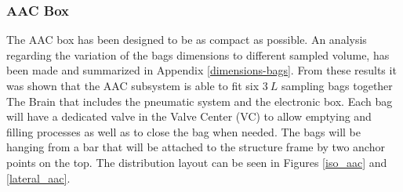 \documentclass[a4paper,12pt,twoside]{article}
\begin{document}
\subsubsection{AAC Box}\label{sec:aac-analysis}
The AAC box has been designed to be as compact as possible. An analysis regarding the variation of the bags dimensions to different sampled volume, has been made and summarized in Appendix \ref{dimensions-bags}. From these results it was shown that the AAC subsystem is able to fit six $3\ L$ sampling bags together The Brain that includes the pneumatic system and the electronic box. Each bag will have a dedicated valve in the Valve Center (VC) to allow emptying and filling processes as well as to close the bag when needed. The bags will be hanging from a bar that will be attached to the structure frame by two anchor points on the top. The distribution layout can be seen in Figures \ref{iso_aac} and \ref{lateral_aac}. 








\end{document}
